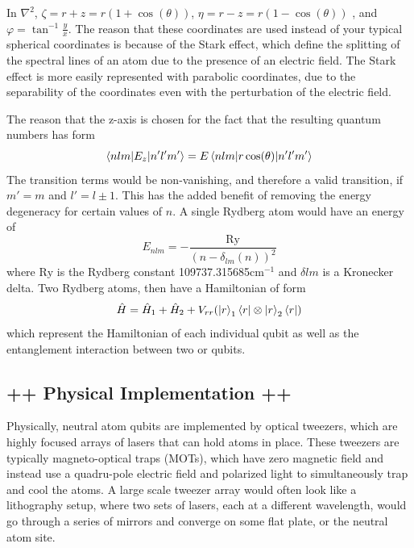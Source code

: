 \documentclass[10pt,letterpaper]{article}
\begin{document}
In $\nabla^{2}$, $\zeta = r + z = r(1 + \cos(\theta))$, $\eta = r - z = r(1 - \cos(\theta))$ , and $\varphi = \tan^{-1}\frac{y}{x}$. The reason that these coordinates are used instead of your typical spherical coordinates is because of the Stark effect, which define the splitting of the spectral lines of an atom due to the presence of an electric field. The Stark effect is more easily represented with parabolic coordinates, due to the separability of the coordinates even with the perturbation of the electric field. 

The reason that the z-axis is chosen for the fact that the resulting quantum numbers has form
$$\braket{nlm | E_{z} | n'l'm'} = E\braket{nlm | r\cos(\theta) | n'l'm'}$$
The transition terms would be non-vanishing, and therefore a valid transition, if $m' = m$ and $l' = l \pm 1$. This has the added benefit of removing the energy degeneracy for certain values of $n$. A single Rydberg atom would have an energy of 
$$E_{nlm} = -\frac{\text{Ry}}{(n - \delta_{lm}(n))^{2}}$$
where $\text{Ry}$ is the Rydberg constant 109737.315685cm$^{-1}$ and $\delta{lm}$ is a Kronecker delta. Two Rydberg atoms, then have a Hamiltonian of form
$$\hat{H} = \hat{H}_{1} + \hat{H}_{2} + V_{rr}(\ket{r}_{1}\bra{r} \otimes \ket{r}_{2}\bra{r})$$
which represent the Hamiltonian of each individual qubit as well as the entanglement interaction between two or qubits. 

\subsection*{++ Physical Implementation ++}

Physically, neutral atom qubits are implemented by optical tweezers, which are highly focused arrays of lasers that can hold atoms in place. These tweezers are typically magneto-optical traps (MOTs), which have zero magnetic field and instead use a quadru-pole electric field and polarized light to simultaneously trap and cool the atoms. A large scale tweezer array would often look like a lithography setup, where two sets of lasers, each at a different wavelength, would go through a series of mirrors and converge on some flat plate, or the neutral atom site. 
\end{document}
